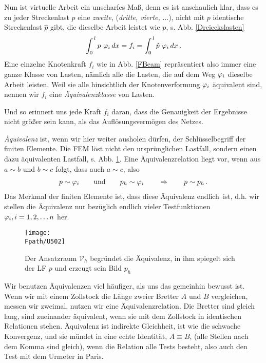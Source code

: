 Nun ist virtuelle Arbeit ein unscharfes Ma{\ss}, denn es ist anschaulich klar, dass es zu jeder Streckenlast $p$ eine {\em zweite}, ({\em dritte, vierte,} ...), nicht mit $p$ identische Streckenlast $\hat{p}$ gibt, die dieselbe Arbeit leistet wie $p$, s. Abb. \ref{Dreieckslasten}
\begin{align}
\int_0^{\,l} p \,\, \varphi_i\, dx = f_i = \int_0^{\,l} \hat{p}\, \, \varphi_i\, dx \,.
\end{align}
Eine einzelne Knotenkraft $f_i$ wie in Abb. \ref{FBeam} repr\"{a}sentiert also immer eine ganze Klasse von Lasten, n\"{a}mlich alle die Lasten, die auf dem Weg $\varphi_i $ dieselbe Arbeit leisten. Weil sie alle hinsichtlich der Knotenverformung $\varphi_i $ \"{a}quivalent sind, nennen wir $f_i$ eine {\em \"{A}quivalenzklasse\/} von Lasten.

Und so erinnert uns jede Kraft $f_i$ daran, dass die Genauigkeit der Ergebnisse nicht gr\"{o}{\ss}er sein kann, als das Aufl\"{o}sungsverm\"{o}gen des Netzes.

{\em \"{A}quivalenz\/} ist, wenn wir hier weiter ausholen d\"{u}rfen, der Schl\"{u}sselbegriff der finiten Elemente. Die FEM l\"{o}st nicht den urspr\"{u}nglichen Lastfall, sondern einen dazu \"{a}quivalenten Lastfall, s. Abb. \ref{U502}. Eine \"{A}quivalenzrelation liegt vor, wenn aus $a \sim b $ und $b \sim c $ folgt, dass auch $a \sim c$, also
\begin{align}
p \sim \varphi_i \qquad \text{und} \qquad p_h \sim \varphi_i \qquad \Rightarrow \qquad p \sim p_h\,.
\end{align}
Das Merkmal der finiten Elemente ist, dass diese \"{A}quivalenz \glq endlich\grq\ ist, d.h. wir stellen die \"{A}quivalenz nur bez\"{u}glich endlich vieler Testfunktionen $\varphi_i, i = 1,2,\ldots n$ her.
\begin{figure}[tbp] \centering
\if {} \sidecaption \fi
\texttt{[image: \\Fpath/U502]}
\caption{Der Ansatzraum $\mathcal{V}_h$ begr\"{u}ndet die \"{A}quivalenz, in ihm spiegelt sich der LF $p$ und erzeugt sein Bild $p_h$} \label{U502}
\end{figure}%

Wir benutzen \"{A}quivalenzen viel h\"{a}ufiger, als uns das gemeinhin bewusst ist. Wenn wir mit einem Zollstock die L\"{a}nge zweier Bretter $A$ und $B$ vergleichen, messen wir zweimal, nutzen wir eine \"{A}quivalenzrelation. Die Bretter sind gleich lang, sind zueinander \"{a}quivalent, wenn sie mit dem Zollstock in identischen Relationen stehen. \"{A}quivalenz ist indirekte Gleichheit, ist wie die schwache Konvergenz, und sie m\"{u}ndet in eine echte Identit\"{a}t, $A \equiv B$, (alle Stellen nach dem Komma sind gleich), wenn die Relation alle Tests besteht, also auch den Test mit dem Urmeter in Paris.

